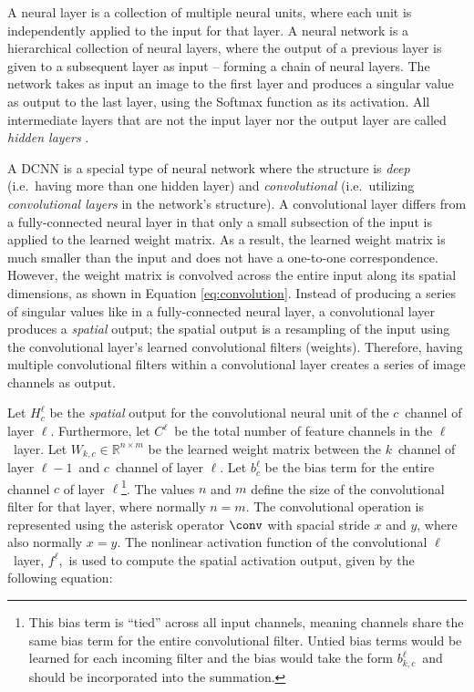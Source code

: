 A neural layer is a collection of multiple neural units, where each unit is independently applied to the input for that layer.  A neural network is a hierarchical collection of neural layers, where the output of a previous layer is given to a subsequent layer as input -- forming a chain of neural layers.  The network takes as input an image to the first layer and produces a singular value as output to the last layer, using the Softmax function as its activation.  All intermediate layers that are not the input layer nor the output layer are called \textit{hidden layers} \cite{funahashi_approximate_1989}.  

A DCNN is a special type of neural network where the structure is \textit{deep} (i.e.\ having more than one hidden layer) and \textit{convolutional} (i.e.\ utilizing \textit{convolutional layers} in the network's structure).  A convolutional layer differs from a fully-connected neural layer in that only a small subsection of the input is applied to the learned weight matrix.  As a result, the learned weight matrix is much smaller than the input and does not have a one-to-one correspondence.  However,  the weight matrix is convolved across the entire input along its spatial dimensions, as shown in Equation \ref{eq:convolution}.  Instead of producing a series of singular values like in a fully-connected neural layer, a convolutional layer produces a \textit{spatial} output; the spatial output is a resampling of the input using the convolutional layer's learned convolutional filters (weights).  Therefore, having multiple convolutional filters within a convolutional layer creates a series of image channels as output.

Let $H_c^\ell$ be the \textit{spatial} output for the convolutional neural unit of the $c$\th\ channel of layer $\ell$.  Furthermore, let $C^{\ell}$\ be the total number of feature channels in the $\ell$\th\ layer.  Let $W_{k,c} \in \mathbb{R}^{n \times m}$ be the learned weight matrix between the $k$\th\ channel of layer $\ell - 1$\ and $c$\th\ channel of layer $\ell$.  Let $b_{c}^\ell$ be the bias term for the entire channel $c$ of layer $\ell$\footnote{This bias term is ``tied'' across all input channels, meaning channels share the same bias term for the entire convolutional filter.  Untied bias terms would be learned for each incoming filter and the bias would take the form $b_{k,c}^\ell$\ and should be incorporated into the summation.}.  The values $n$ and $m$ define the size of the convolutional filter for that layer, where normally $n = m$.  The convolutional operation is represented using the asterisk operator $\conv$ with spacial stride $x$ and $y$, where also normally $x = y$.  The nonlinear activation function of the convolutional $\ell$\ layer, $f^\ell$,\ is used to compute the spatial activation output, given by the following equation:

